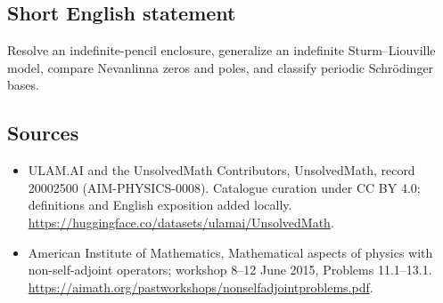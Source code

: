 \documentclass[11pt]{article}
\begin{document}
\subsection{Short English statement}
Resolve an indefinite-pencil enclosure, generalize an indefinite Sturm–Liouville model, compare Nevanlinna zeros and poles, and classify periodic Schrödinger bases.
\subsection{Sources}
\begin{itemize}
\item[\hypertarget{source:20002500:1}{S1}] ULAM.AI and the UnsolvedMath Contributors, UnsolvedMath, record 20002500 (AIM-PHYSICS-0008). Catalogue curation under CC BY 4.0; definitions and English exposition added locally.
\url{https://huggingface.co/datasets/ulamai/UnsolvedMath}.
\item[\hypertarget{source:20002500:2}{S2}] American Institute of Mathematics, Mathematical aspects of physics with non-self-adjoint operators; workshop 8–12 June 2015, Problems 11.1–13.1.
\url{https://aimath.org/pastworkshops/nonselfadjointproblems.pdf}.
\end{itemize}
\label{end:20002500}
\end{document}
